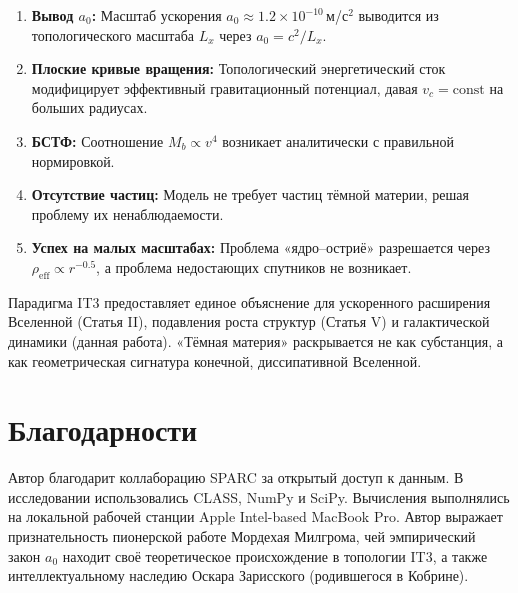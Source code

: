 \documentclass[12pt,a4paper]{article}
\begin{document}
\begin{enumerate}
    \item \textbf{Вывод $a_0$:} Масштаб ускорения $a_0 \approx 1.2 \times 10^{-10}$\,м/с$^2$ выводится из топологического масштаба $L_x$ через $a_0 = c^2/L_x$.
    \item \textbf{Плоские кривые вращения:} Топологический энергетический сток модифицирует эффективный гравитационный потенциал, давая $v_c = \mathrm{const}$ на больших радиусах.
    \item \textbf{БСТФ:} Соотношение $M_b \propto v^4$ возникает аналитически с правильной нормировкой.
    \item \textbf{Отсутствие частиц:} Модель не требует частиц тёмной материи, решая проблему их ненаблюдаемости.
    \item \textbf{Успех на малых масштабах:} Проблема «ядро–остриё» разрешается через $\rho_{\mathrm{eff}} \propto r^{-0.5}$, а проблема недостающих спутников не возникает.
\end{enumerate}

Парадигма IT3 предоставляет единое объяснение для ускоренного расширения Вселенной (Статья II), подавления роста структур (Статья V) и галактической динамики (данная работа). «Тёмная материя» раскрывается не как субстанция, а как геометрическая сигнатура конечной, диссипативной Вселенной.

\section*{Благодарности}

Автор благодарит коллаборацию SPARC за открытый доступ к данным. В исследовании использовались CLASS, NumPy и SciPy. Вычисления выполнялись на локальной рабочей станции Apple Intel-based MacBook Pro. Автор выражает признательность пионерской работе Мордехая Милгрома, чей эмпирический закон $a_0$ находит своё теоретическое происхождение в топологии IT3, а также интеллектуальному наследию Оскара Зарисского (родившегося в Кобрине).
\end{document}
